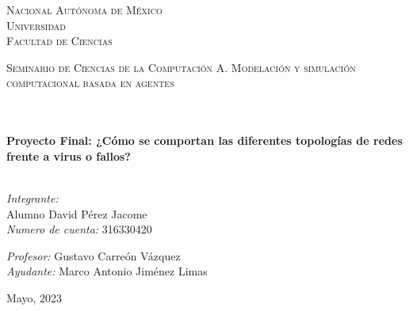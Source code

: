 \documentclass[14pt]{book}
\begin{document}
\begin{center}
\begin{minipage}{0.48\textwidth}
\begin{flushright}
    \end{flushright}
  \end{minipage}
  \vspace*{-1.5cm}
  \textsc{\huge Nacional Autónoma de México \\ \vspace{-4px} Universidad }\\[2cm]
  \textsc{\LARGE Facultad de Ciencias}\\[1.5cm]
  \begin{minipage}{0.9\textwidth}
    \begin{center}
      \textsc{\LARGE Seminario de Ciencias de la Computación A. Modelación y simulación computacional basada en agentes}
    \end{center}
  \end{minipage}\\[0.5cm]
  \vspace*{1cm}
  \HRule \\[0.4cm]
  { \huge \bfseries Proyecto Final: ¿Cómo se comportan las diferentes topologías de redes frente a virus o fallos?}\\[0.4cm]
  \HRule \\[1.5cm]
  \begin{minipage}{0.52\textwidth}
    \begin{flushleft} \large \small \vspace{-0.6cm} \vspace{-0.6cm}
      \emph{Integrante:}\\
      Alumno David Pérez Jacome \\
      \emph{Numero de cuenta:} 316330420 \vspace*{2cm}
    \end{flushleft}
  \end{minipage}
  \begin{minipage}{0.46\textwidth}
    \vspace{-0.6cm}
    \begin{flushright} \large \small \emph{Profesor:}
      Gustavo Carreón Vázquez \\
      \emph{Ayudante:}
      Marco Antonio Jiménez Limas \\
    \end{flushright}
  \end{minipage}
  \vspace*{1cm}
  \vspace{2cm}
  \begin{center}
    {\large Mayo, 2023}
  \end{center}
\end{center}
\end{document}
